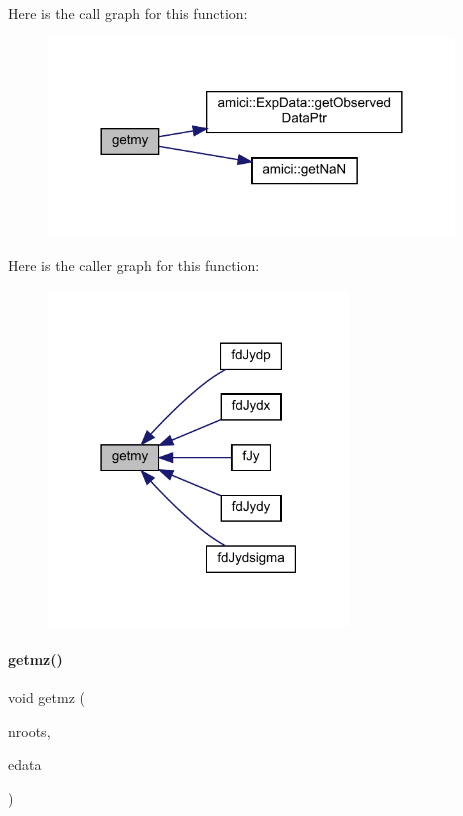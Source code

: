 Here is the call graph for this function\+:
\nopagebreak
\begin{figure}[H]
\begin{center}
\leavevmode
\includegraphics[width=305pt]{classamici_1_1_model_aa01d5361cf972cce5eaddca05985f745_cgraph}
\end{center}
\end{figure}
Here is the caller graph for this function\+:
\nopagebreak
\begin{figure}[H]
\begin{center}
\leavevmode
\includegraphics[width=226pt]{classamici_1_1_model_aa01d5361cf972cce5eaddca05985f745_icgraph}
\end{center}
\end{figure}
\mbox{\label{classamici_1_1_model_a523a7d80e06bfab324d566dd6032abcf}} 
\paragraph{\texorpdfstring{getmz()}{getmz()}}
{\footnotesize\ttfamily void getmz (\begin{DoxyParamCaption}\item[{const int}]{nroots,  }\item[{const \mbox{\hyperlink{classamici_1_1_exp_data}{Exp\+Data}} $\ast$}]{edata }\end{DoxyParamCaption})\hspace{0.3cm}{\ttfamily [protected]}}

